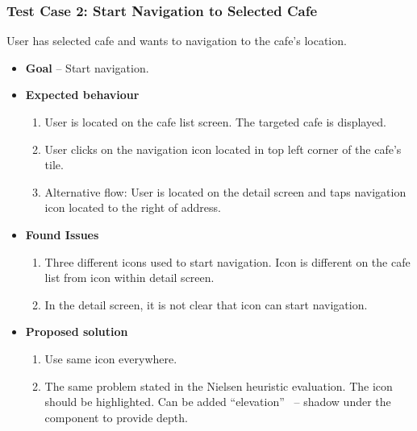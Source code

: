 \subsubsection{Test Case 2: Start Navigation to Selected Cafe}
User has selected cafe and wants to navigation to the cafe's location.
\begin{itemize}
    \item \textbf{Goal} -- Start navigation.
    \item \textbf{Expected behaviour}
    \begin{enumerate}
        \item User is located on the cafe list screen. The targeted cafe is displayed.
        \item User clicks on the navigation icon located in top left corner of the cafe's tile. 
        \item Alternative flow: User is located on the detail screen and taps navigation icon located to the right of address.
    \end{enumerate}
    \item \textbf{Found Issues}
    \begin{enumerate}
        \item Three different icons used to start navigation. Icon is different on the cafe list from icon within detail screen.
        \item In the detail screen, it is not clear that icon can start navigation.
    \end{enumerate}
    \item \textbf{Proposed solution}
    \begin{enumerate}
        \item Use same icon everywhere.
        \item The same problem stated in the Nielsen heuristic evaluation. The icon should be highlighted. Can be added ``elevation''~\cite{material-design-elevation} -- shadow under the component to provide depth. 
    \end{enumerate}
\end{itemize}

